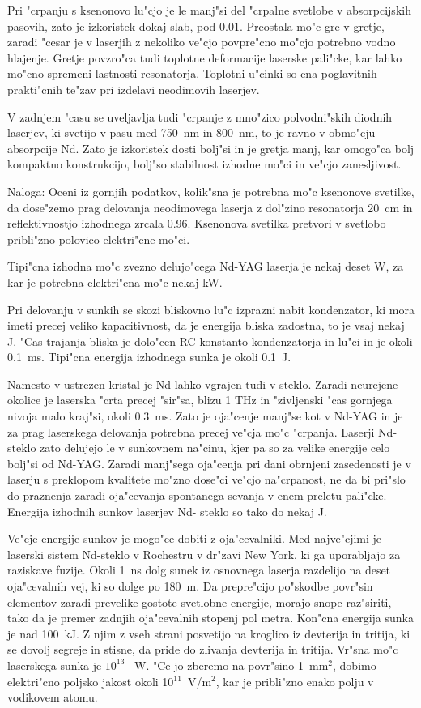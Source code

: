 Pri "crpanju s ksenonovo lu"cjo je le manj"si del "crpalne svetlobe v
absorpcijskih pasovih, zato je izkoristek dokaj slab, pod 0.01. Preostala
mo"c gre v gretje, zaradi "cesar je v laserjih z nekoliko ve"cjo povpre"cno
mo"cjo potrebno vodno hlajenje. Gretje povzro"ca tudi toplotne deformacije
laserske pali"cke, kar lahko mo"cno spremeni lastnosti resonatorja. Toplotni
u"cinki so ena poglavitnih prakti"cnih te"zav pri izdelavi neodimovih
laserjev.

V zadnjem "casu se uveljavlja tudi "crpanje z mno"zico polvodni"skih diodnih
laserjev, ki svetijo v pasu med 750~nm in 800~nm, to je ravno v obmo"cju
absorpcije Nd. Zato je izkoristek dosti bolj"si in je gretja manj, kar
omogo"ca bolj kompaktno konstrukcijo, bolj"so stabilnost izhodne mo"ci in
ve"cjo zanesljivost.

Naloga: Oceni iz gornjih podatkov, kolik"sna je potrebna mo"c ksenonove
svetilke, da dose"zemo prag delovanja neodimovega laserja z dol"zino
resonatorja 20~cm in reflektivnostjo izhodnega zrcala 0.96. Ksenonova
svetilka pretvori v svetlobo pribli"zno polovico elektri"cne mo"ci.

Tipi"cna izhodna mo"c zvezno delujo"cega Nd-YAG laserja je nekaj deset W, za
kar je potrebna elektri"cna mo"c nekaj kW.

Pri delovanju v sunkih se skozi bliskovno lu"c izprazni nabit kondenzator,
ki mora imeti precej veliko kapacitivnost, da je energija bliska zadostna,
to je vsaj nekaj J. "Cas trajanja bliska je dolo"cen RC konstanto
kondenzatorja in lu"ci in je okoli 0.1~ms. Tipi"cna energija izhodnega sunka
je okoli 0.1~J.

Namesto v ustrezen kristal je Nd lahko vgrajen tudi v steklo. Zaradi
neurejene okolice je laserska "crta precej "sir"sa, blizu 1 THz in
"zivljenski "cas gornjega nivoja malo kraj"si, okoli 0.3~ms. Zato je
oja"cenje manj"se kot v Nd-YAG in je za prag laserskega delovanja potrebna
precej ve"cja mo"c "crpanja. Laserji Nd-steklo zato delujejo le v sunkovnem
na"cinu, kjer pa so za velike energije celo bolj"si od Nd-YAG. Zaradi
manj"sega oja"cenja pri dani obrnjeni zasedenosti je v laserju s preklopom
kvalitete mo"zno dose"ci ve"cjo na"crpanost, ne da bi pri"slo do praznenja
zaradi oja"cevanja spontanega sevanja v enem preletu pali"cke. Energija
izhodnih sunkov laserjev Nd- steklo so tako do nekaj J.

Ve"cje energije sunkov je mogo"ce dobiti z oja"cevalniki. Med najve"cjimi je
laserski sistem Nd-steklo v Rochestru v dr"zavi New York, ki ga uporabljajo
za raziskave fuzije. Okoli 1~ns dolg sunek iz osnovnega laserja razdelijo na
deset oja"cevalnih vej, ki so dolge po 180~m. Da prepre"cijo po"skodbe
povr"sin elementov zaradi prevelike gostote svetlobne energije, morajo snope
raz"siriti, tako da je premer zadnjih oja"cevalnih stopenj pol metra.
Kon"cna energija sunka je nad 100~kJ. Z njim z vseh strani posvetijo na
kroglico iz devterija in tritija, ki se dovolj segreje in stisne, da pride
do zlivanja devterija in tritija. Vr"sna mo"c laserskega sunka je $10^{13}$%
~W. "Ce jo zberemo na povr"sino 1~mm$^2$, dobimo elektri"cno poljsko jakost
okoli 10$^{11}$~V/m$^2$, kar je pribli"zno enako polju v vodikovem atomu.

